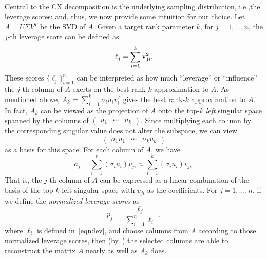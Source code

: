 Central to the CX decomposition is the underlying sampling distribution, i.e.,the  leverage scores; and, thus, we now provide some intuition for our choice.
Let $A=U\Sigma V^T$ be the SVD of $A$.
Given a target rank parameter $k$, for $j=1,\ldots,n$, the $j$-th leverage score can be defined as
\begin{equation}
 \label{eqn:lev}
  \ell_j = \sum_{i=1}^k \mathbf{v}_{ji}^2.
\end{equation}
These scores $\{\ell_j\}_{i=1}^{n}$ can be interpreted as how much ``leverage'' or ``influence'' the $j$-th column of $A$ exerts on the best rank-$k$ approximation to $A$. 
As mentioned above, $A_k = \sum_{i=1}^k \sigma_i u_i v_i^T$ gives the best rank-$k$ approximation to $A$.
In fact, $A_k$ can be viewed as the projection of $A$ onto the top-$k$ \emph{left} singular space spanned by the columns of $\begin{pmatrix} u_1 & \cdots & u_k \end{pmatrix}$.
Since multiplying each column by the corresponding singular value does not alter the subspace, we can view
$$
\begin{pmatrix} \sigma_1 u_1 & \cdots & \sigma_k u_k \end{pmatrix}
$$ 
as a basis for this space.  
For each column of $A$, we have 
  $$  a_j = \sum_{i=1}^{r} (\sigma_i u_i) v_{ji} \approx \sum_{i=1}^k (\sigma_i u_i) v_{ji}.  $$
That is, the $j$-th column of $A$ can be expressed as a linear combination of the basis of the top-$k$ left singular space with $v_{ji}$ as the coefficients.
For $j=1,\ldots,n$, if we define the {\it normalized leverage scores} as
\begin{equation}
\label{eqn:nlev}
  p_j = \frac{\ell_j}{\sum_{i=1}^n \ell_i},
\end{equation}      
where $\ell_i$ is defined in~\eqref{eqn:lev}, and choose columns from $A$ according to those normalized leverage scores, then (by~\cite{DMM08,CUR_PNAS}) the selected columns are able to reconstruct the matrix $A$ nearly as well as $A_k$ does.

